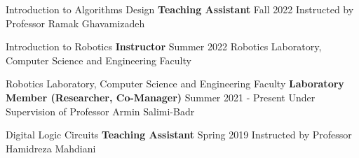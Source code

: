 \begin{cventries}
    \cventry
    {Introduction to Algorithms Design}
    {\bullet \space \textbf {Teaching Assistant}}
    {}
    {Fall 2022}
    {Instructed by Professor Ramak Ghavamizadeh}
    \vspace{0.4 cm}
    
    \cventry
    {Introduction to Robotics}
    {\bullet \space \textbf {Instructor}}
    {}
    {Summer 2022}
    {Robotics Laboratory, Computer Science and Engineering Faculty}
    \vspace{0.4 cm}

    \cventry
    {Robotics Laboratory, Computer Science and Engineering Faculty}
    {\bullet \space \textbf {Laboratory Member (Researcher, Co-Manager)}}
    {}
    {Summer 2021 - Present}
    {Under Supervision of Professor Armin Salimi-Badr}
    \vspace{0.4 cm}
    
    \cventry
    {Digital Logic Circuits}
    {\bullet \space \textbf {Teaching Assistant}}
    {}
    {Spring 2019}
    {Instructed by Professor Hamidreza Mahdiani}
    
\end{cventries}